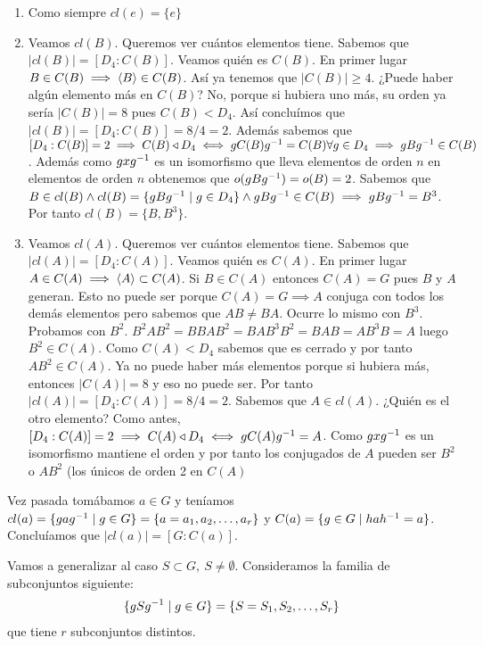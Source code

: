 \begin{ej}
	\begin{enumerate}
		\item Como siempre $cl(e) = \{e\}$
		\item Veamos $cl(B)$. Queremos ver cuántos elementos tiene. Sabemos que $|cl(B)| = [D_4:C(B)]$. Veamos quién es $C(B)$. En primer lugar $B \in C(B) \implies \langle B\rangle \in C(B)$. Así ya tenemos que $|C(B)| \geq 4$. ¿Puede haber algún elemento más en $C(B)$? No, porque si hubiera uno más, su orden ya sería $|C(B)| = 8$ pues $C(B) < D_4$. Así concluímos que $|cl(B)| = [D_4:C(B)] = 8 / 4 = 2$. Además sabemos que $[D_4:C(B)] = 2 \implies C(B) \mathbin{\triangleleft} D_4 \iff gC(B)g^{-1} = C(B) \forall g \in D_4 \implies gBg^{-1} \in C(B)$. Además como $gxg^{-1}$ es un isomorfismo que lleva elementos de orden $n$ en elementos de orden $n$ obtenemos que $o(gBg^{-1}) = o(B) = 2$. Sabemos que $B \in cl(B) \land cl(B) = \{gBg^{-1} \mid g \in D_4\} \land gBg^{-1} \in C(B) \implies gBg^{-1} = B^3$. Por tanto $cl(B) = \{B, B^3\}$.
		\item Veamos $cl(A)$. Queremos ver cuántos elementos tiene. Sabemos que $|cl(A)| = [D_4:C(A)]$. Veamos quién es $C(A)$. En primer lugar $A \in C(A) \implies \langle A\rangle \subset C(A)$. Si $B \in C(A)$ entonces $C(A) = G$ pues $B$ y $A$ generan. Esto no puede ser porque $C(A) = G \implies A$ conjuga con todos los demás elementos pero sabemos que $AB \neq BA$. Ocurre lo mismo con $B^3$. Probamos con $B^2$. $B^2AB^2 = BBAB^2 = BAB^3B^2 = BAB = AB^3B = A$ luego $B^2 \in C(A)$. Como $C(A) < D_4$ sabemos que es cerrado y por tanto $AB^2 \in C(A)$. Ya no puede haber más elementos porque si hubiera más, entonces $|C(A)| = 8$ y eso no puede ser. Por tanto $|cl(A)| = [D_4:C(A)] = 8 / 4 = 2$. Sabemos que $A \in cl(A)$. ¿Quién es el otro elemento? Como antes, $[D_4:C(A)] = 2 \implies C(A) \mathbin{\triangleleft} D_4 \iff gC(A)g^{-1} = A$. Como $gxg^{-1}$ es un isomorfismo mantiene el orden y por tanto los conjugados de $A$ pueden ser $B^2$ o $AB^2$ (los únicos de orden 2 en $C(A)$
	\end{enumerate}
\end{ej}


\hr


Vez pasada tomábamos $a \in G$ y teníamos $cl(a) = \{g a g^{-1} \mid g \in G\} = \{a=a_1, a_2, \dots, a_r\}$ y $C(a) = \{g \in G \mid hah^{-1} = a \}$. Concluíamos que $|cl(a)| = [G:C(a)]$.

Vamos a generalizar al caso $S \subset G,\ S \neq \emptyset$. Consideramos la familia de subconjuntos siguiente:
\begin{align*}
\{gSg^{-1} \mid g \in G\} = \{S = S_1, S_2, \dots, S_r\}
\end{align*}
que tiene $r$ subconjuntos distintos.

